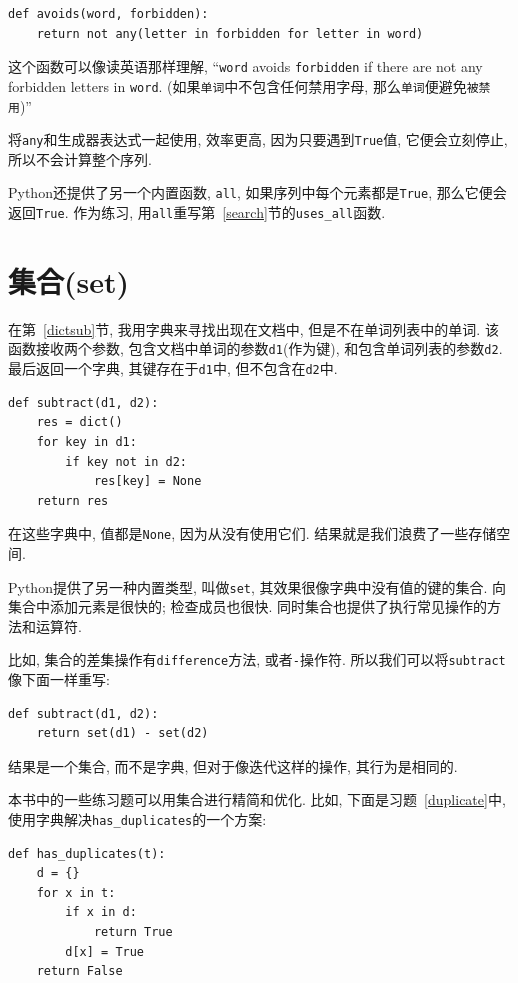 \documentclass[10pt]{book}
\begin{document}
\begin{verbatim}
def avoids(word, forbidden):
    return not any(letter in forbidden for letter in word)
\end{verbatim}
%
这个函数可以像读英语那样理解, ``{\tt word} avoids
{\tt forbidden} if there are not any forbidden letters in {\tt word}.
(如果{\tt 单词}中不包含任何禁用字母, 那么{\tt 单词}便避免{\tt 被禁用})''

将{\tt any}和生成器表达式一起使用, 效率更高, 因为只要遇到{\tt True}值, 它便会立刻停止, 
所以不会计算整个序列. 

Python还提供了另一个内置函数, {\tt all}, 如果序列中每个元素都是{\tt True}, 
那么它便会返回{\tt True}.
作为练习, 用{\tt all}重写第~\ref{search}节的\verb"uses_all"函数.


\section{集合(set)}
\label{sets}

在第~\ref{dictsub}节, 我用字典来寻找出现在文档中, 但是不在单词列表中的单词. 
该函数接收两个参数, 包含文档中单词的参数{\tt d1}(作为键),  和包含单词列表的参数{\tt d2}. 
最后返回一个字典, 其键存在于{\tt d1}中, 但不包含在{\tt d2}中. 

\begin{verbatim}
def subtract(d1, d2):
    res = dict()
    for key in d1:
        if key not in d2:
            res[key] = None
    return res
\end{verbatim}
%
在这些字典中, 值都是{\tt None}, 因为从没有使用它们. 
结果就是我们浪费了一些存储空间. 

Python提供了另一种内置类型, 叫做{\tt set}, 
其效果很像字典中没有值的键的集合. 
向集合中添加元素是很快的; 检查成员也很快. 
同时集合也提供了执行常见操作的方法和运算符. 

比如, 集合的差集操作有{\tt difference}方法, 或者{\tt -}操作符. 
所以我们可以将{\tt subtract}像下面一样重写:

\begin{verbatim}
def subtract(d1, d2):
    return set(d1) - set(d2)
\end{verbatim}
%
结果是一个集合, 而不是字典, 
但对于像迭代这样的操作, 其行为是相同的. 

本书中的一些练习题可以用集合进行精简和优化. 
比如, 下面是习题~\ref{duplicate}中, 使用字典解决\verb"has_duplicates"的一个方案:

\begin{verbatim}
def has_duplicates(t):
    d = {}
    for x in t:
        if x in d:
            return True
        d[x] = True
    return False
\end{verbatim}
\end{document}
